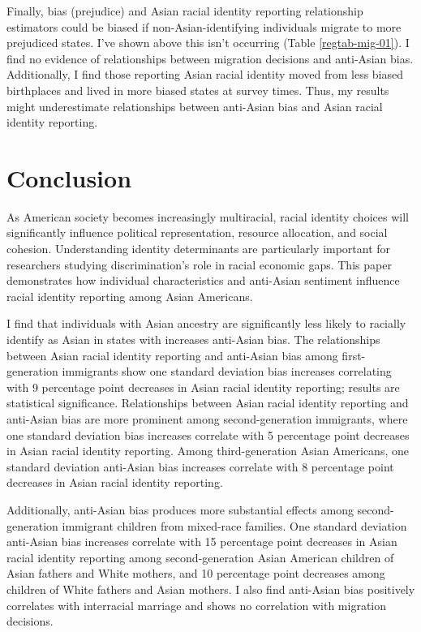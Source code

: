 Finally, bias (prejudice) and Asian racial identity reporting relationship estimators could be biased if non-Asian-identifying individuals migrate to more prejudiced states. I've shown above this isn't occurring (Table \ref{regtab-mig-01}). I find no evidence of relationships between migration decisions and anti-Asian bias. Additionally, I find those reporting Asian racial identity moved from less biased birthplaces and lived in more biased states at survey times. Thus, my results might underestimate relationships between anti-Asian bias and Asian racial identity reporting.

\section{Conclusion}\label{sec:conc}

As American society becomes increasingly multiracial, racial identity choices will significantly influence political representation, resource allocation, and social cohesion. Understanding identity determinants are particularly important for researchers studying discrimination's role in racial economic gaps. This paper demonstrates how individual characteristics and anti-Asian sentiment influence racial identity reporting among Asian Americans.

I find that individuals with Asian ancestry are significantly less likely to racially identify as Asian in states with increases anti-Asian bias. The relationships between Asian racial identity reporting and anti-Asian bias among first-generation immigrants show one standard deviation bias increases correlating with 9 percentage point decreases in Asian racial identity reporting; results are statistical significance. Relationships between Asian racial identity reporting and anti-Asian bias are more prominent among second-generation immigrants, where one standard deviation bias increases correlate with 5 percentage point decreases in Asian racial identity reporting. Among third-generation Asian Americans, one standard deviation anti-Asian bias increases correlate with 8 percentage point decreases in Asian racial identity reporting.

Additionally, anti-Asian bias produces more substantial effects among second-generation immigrant children from mixed-race families. One standard deviation anti-Asian bias increases correlate with 15 percentage point decreases in Asian racial identity reporting among second-generation Asian American children of Asian fathers and White mothers, and 10 percentage point decreases among children of White fathers and Asian mothers. I also find anti-Asian bias positively correlates with interracial marriage and shows no correlation with migration decisions.

